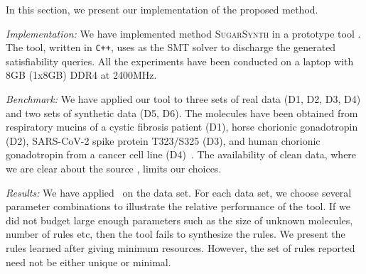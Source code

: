 In this section, we present our implementation of the proposed method.

{\em Implementation:} 
We have implemented method \textsc{SugarSynth} in a prototype tool {\ourtool}.
%
The tool, written in {\tt C++}, uses {\zthree}\cite{z3} as the SMT solver
to discharge the generated satisfiability queries. All the experiments have been conducted on a laptop with 8GB (1x8GB) DDR4 at 2400MHz.
%


{\em Benchmark: }
We have applied our tool to three sets of real data (D1, D2, D3, D4) and two sets of synthetic data (D5, D6). The molecules have been obtained from
respiratory mucins of a cystic fibrosis patient (D1),
horse chorionic gonadotropin (D2), SARS-CoV-2 spike protein T323/S325 (D3), and human chorionic gonadotropin from a cancer cell line (D4)~\cite{Jaiman2018,10.1093/glycob/cwaa042}.
The availability of clean data, where we are clear about the source
, limits our choices.

% 



{\em Results:}
We have applied \ourtool~on the data set. For each data set, we choose several
parameter combinations to illustrate the relative performance of the tool.
If we did not budget large enough parameters such as the size of unknown molecules, number of rules etc, then the tool fails to
synthesize the rules.
We present the rules learned after giving minimum resources. However, the set of rules reported need not be either unique or minimal.


